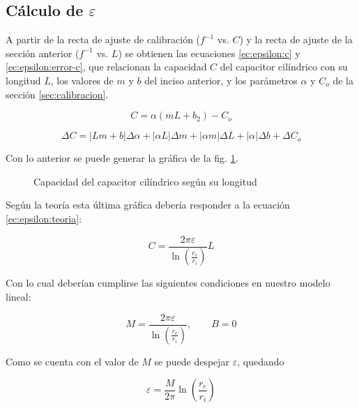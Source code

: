 \subsection{Cálculo de $\varepsilon$}

A partir de la recta de ajuste de calibración ($f^{-1}$ vs. $C$) y la recta de
ajuste de la sección anterior ($f^{-1}$ vs. $L$) se obtienen las ecuaciones
\ref{ec:epsilon:c} y \ref{ec:epsilon:error-c}, que relacionan la capacidad $C$
del capacitor cilíndrico con su longitud $L$, los valores de $m$ y $b$ del
inciso anterior, y los parámetros $\alpha$ y $C_o$ de la sección
\ref{sec:calibracion}.

\begin{equation}
    \label{ec:epsilon:c}
    C = \alpha \left( mL + b_2 \right) - C_o
\end{equation}

\begin{equation}
    \label{ec:epsilon:error-c}
    \Delta C = \left| Lm + b \right| \Delta \alpha
             + \left| \alpha L \right| \Delta m
             + \left| \alpha m \right| \Delta L
             + \left| \alpha \right| \Delta b
             + \Delta C_o
\end{equation}

Con lo anterior se puede generar la gráfica de la fig. 
\ref{fig:epsilon:cvsl}.

\begin{figure}[H]
    \centering
    
    \caption{Capacidad del capacitor cilíndrico según su longitud}
    \label{fig:epsilon:cvsl}
\end{figure}

Según la teoría esta última gráfica debería responder a la ecuación 
\ref{ec:epsilon:teoria}:

\begin{equation}
    \label{ec:epsilon:teoria}
    C = \frac{2\pi\varepsilon}{\ln\left(\frac{r_e}{r_i}\right)} L
\end{equation}

Con lo cual deberían cumplirse las siguientes condiciones en nuestro modelo
lineal:

\[
    M = \frac{2\pi\varepsilon}{\ln\left(\frac{r_e}{r_i}\right)}, 
    \quad\quad B = 0
\]

Como se cuenta con el valor de $M$ se puede despejar $\varepsilon$, quedando

\begin{equation}
    \label{ec:epsilon:epsilon}
    \varepsilon = \frac{M}{2\pi} \ln \left(\frac{r_e}{r_i}\right)
\end{equation}

